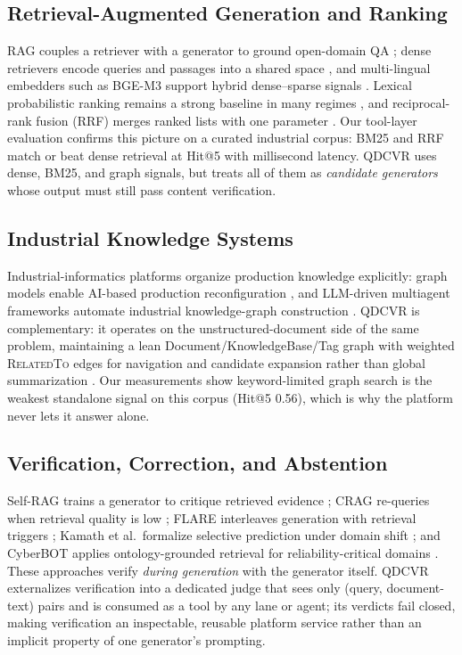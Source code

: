 \documentclass[journal]{IEEEtran}
\begin{document}
\subsection{Retrieval-Augmented Generation and Ranking}
RAG couples a retriever with a generator to ground open-domain QA
\cite{rag-lewis}; dense retrievers encode queries and passages into a
shared space \cite{dpr}, and multi-lingual embedders such as BGE-M3
support hybrid dense--sparse signals \cite{bge-m3}. Lexical probabilistic
ranking remains a strong baseline in many regimes \cite{bm25}, and
reciprocal-rank fusion (RRF) merges ranked lists with one parameter
\cite{rrf-cormack}. Our tool-layer evaluation confirms this picture on a
curated industrial corpus: BM25 and RRF match or beat dense retrieval at
Hit@5 with millisecond latency. QDCVR uses dense, BM25, and graph
signals, but treats all of them as \emph{candidate generators} whose
output must still pass content verification.

\subsection{Industrial Knowledge Systems}
Industrial-informatics platforms organize production knowledge explicitly:
graph models enable AI-based production reconfiguration \cite{rrpdg}, and
LLM-driven multiagent frameworks automate industrial knowledge-graph
construction \cite{comaikg}. QDCVR is complementary: it operates on the
unstructured-document side of the same problem, maintaining a lean
Document/KnowledgeBase/Tag graph with weighted \textsc{RelatedTo} edges
for navigation and candidate expansion rather than global summarization
\cite{graphrag,lightrag,raptor}. Our measurements show keyword-limited
graph search is the weakest standalone signal on this corpus (Hit@5
0.56), which is why the platform never lets it answer alone.

\subsection{Verification, Correction, and Abstention}
Self-RAG trains a generator to critique retrieved evidence
\cite{selfrag}; CRAG re-queries when retrieval quality is low \cite{crag};
FLARE interleaves generation with retrieval triggers \cite{flare}; Kamath
et al.\ formalize selective prediction under domain shift \cite{kamath};
and CyberBOT applies ontology-grounded retrieval for
reliability-critical domains \cite{cyberbot}. These approaches verify
\emph{during generation} with the generator itself. QDCVR externalizes
verification into a dedicated judge that sees only (query, document-text)
pairs and is consumed as a tool by any lane or agent; its verdicts fail
closed, making verification an inspectable, reusable platform service
rather than an implicit property of one generator's prompting.
\end{document}
